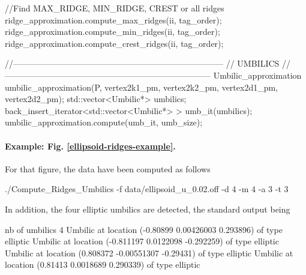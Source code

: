 \begin{ccExampleCode}
{  //Find MAX_RIDGE, MIN_RIDGE, CREST or all ridges
  ridge_approximation.compute_max_ridges(ii, tag_order);  
  ridge_approximation.compute_min_ridges(ii, tag_order);  
  ridge_approximation.compute_crest_ridges(ii, tag_order);  

  //---------------------------------------------------------------------------
  // UMBILICS
  //--------------------------------------------------------------------------
  Umbilic_approximation umbilic_approximation(P, 
					      vertex2k1_pm, vertex2k2_pm,
					      vertex2d1_pm, vertex2d2_pm);
  std::vector<Umbilic*> umbilics;
  back_insert_iterator<std::vector<Umbilic*> > umb_it(umbilics);
  umbilic_approximation.compute(umb_it, umb_size);
 }
\end{ccExampleCode}

\paragraph{Example:  Fig. \ref{ellipsoid-ridges-example}.}
For that figure, the data have been computed as follows
\begin{ccExampleCode}
./Compute_Ridges_Umbilics -f data/ellipsoid_u_0.02.off -d 4 -m 4 -a 3 -t 3
\end{ccExampleCode}
In addition, the four elliptic umbilics are detected, the standard output being
\begin{ccExampleCode}
nb of umbilics 4
Umbilic at location (-0.80899 0.00426003 0.293896) of type elliptic
Umbilic at location (-0.811197 0.0122098 -0.292259) of type elliptic
Umbilic at location (0.808372 -0.00551307 -0.29431) of type elliptic
Umbilic at location (0.81413 0.0018689 0.290339) of type elliptic
\end{ccExampleCode}


